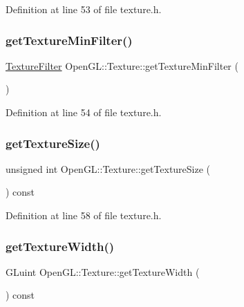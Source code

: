 Definition at line 53 of file texture.\+h.

\mbox{\label{class_open_g_l_1_1_texture_a9bc108632436d11c6f1242ea7d301914}} 
\subsubsection{\texorpdfstring{getTextureMinFilter()}{getTextureMinFilter()}}
{\footnotesize\ttfamily \mbox{\hyperlink{namespace_open_g_l_a34bc5965567ca64f43e5e38e7cfdb2e4}{Texture\+Filter}} Open\+G\+L\+::\+Texture\+::get\+Texture\+Min\+Filter (\begin{DoxyParamCaption}{ }\end{DoxyParamCaption})\hspace{0.3cm}{\ttfamily [inline]}}



Definition at line 54 of file texture.\+h.

\mbox{\label{class_open_g_l_1_1_texture_a85d6c0174b566fee142071e57d6537c9}} 
\subsubsection{\texorpdfstring{getTextureSize()}{getTextureSize()}}
{\footnotesize\ttfamily unsigned int Open\+G\+L\+::\+Texture\+::get\+Texture\+Size (\begin{DoxyParamCaption}{ }\end{DoxyParamCaption}) const\hspace{0.3cm}{\ttfamily [inline]}}



Definition at line 58 of file texture.\+h.

\mbox{\label{class_open_g_l_1_1_texture_a3dce8a3d16bc4a3a98f0dfa5a8979e4b}} 
\subsubsection{\texorpdfstring{getTextureWidth()}{getTextureWidth()}}
{\footnotesize\ttfamily G\+Luint Open\+G\+L\+::\+Texture\+::get\+Texture\+Width (\begin{DoxyParamCaption}{ }\end{DoxyParamCaption}) const\hspace{0.3cm}{\ttfamily [inline]}}



